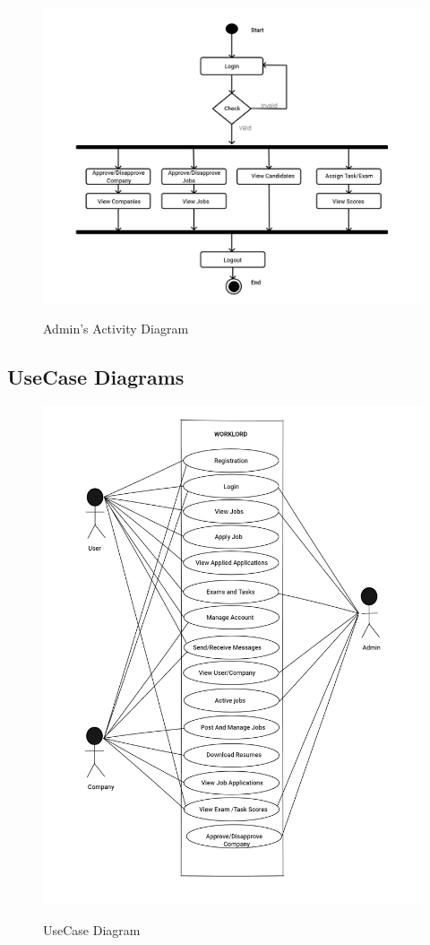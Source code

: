 \documentclass[a4paper,12pt]{report}
\begin{document}
\pagebreak

\vspace*{12pt}
\begin{figure}[bph]
	\centering
	\includegraphics[width=1.1\linewidth]{img/adminactivity}
	\label{fig:adminractivity}
	\caption{Admin's Activity Diagram}
\end{figure}
\pagebreak
\subsection{UseCase Diagrams}

\vspace*{12pt}
\begin{figure}[bph]
	\centering
	\includegraphics[width=.7\linewidth]{img/use_case_diagram}
	\label{fig:usecasediagram}
	\caption{UseCase Diagram}
\end{figure}
\pagebreak
\end{document}
